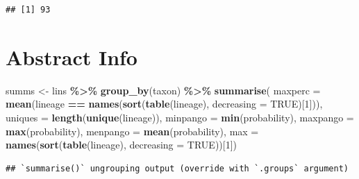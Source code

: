 \documentclass[
]{article}
\newenvironment{Shaded}{\begin{snugshade}}{\end{snugshade}}
\newcommand{\CommentTok}[1]{\textcolor[rgb]{0.56,0.35,0.01}{\textit{#1}}}
\newcommand{\DataTypeTok}[1]{\textcolor[rgb]{0.13,0.29,0.53}{#1}}
\newcommand{\DecValTok}[1]{\textcolor[rgb]{0.00,0.00,0.81}{#1}}
\newcommand{\KeywordTok}[1]{\textcolor[rgb]{0.13,0.29,0.53}{\textbf{#1}}}
\newcommand{\NormalTok}[1]{#1}
\newcommand{\OperatorTok}[1]{\textcolor[rgb]{0.81,0.36,0.00}{\textbf{#1}}}
\newcommand{\OtherTok}[1]{\textcolor[rgb]{0.56,0.35,0.01}{#1}}
\newcommand{\StringTok}[1]{\textcolor[rgb]{0.31,0.60,0.02}{#1}}
\begin{document}
\begin{Shaded}
\end{Shaded}

\begin{verbatim}
## [1] 93
\end{verbatim}

\hypertarget{abstract-info}{%
\section{Abstract Info}\label{abstract-info}}

\begin{Shaded}
\begin{Highlighting}[]
\NormalTok{summs \textless{}{-}}\StringTok{ }\NormalTok{lins }\OperatorTok{\%\textgreater{}\%}
\StringTok{    }\KeywordTok{group\_by}\NormalTok{(taxon) }\OperatorTok{\%\textgreater{}\%}
\StringTok{    }\KeywordTok{summarise}\NormalTok{(}
        \DataTypeTok{maxperc =} \KeywordTok{mean}\NormalTok{(lineage }\OperatorTok{==}\StringTok{ }\KeywordTok{names}\NormalTok{(}\KeywordTok{sort}\NormalTok{(}\KeywordTok{table}\NormalTok{(lineage),}
            \DataTypeTok{decreasing =} \OtherTok{TRUE}\NormalTok{)[}\DecValTok{1}\NormalTok{])),}
        \DataTypeTok{uniques =} \KeywordTok{length}\NormalTok{(}\KeywordTok{unique}\NormalTok{(lineage)),}
        \DataTypeTok{minpango =} \KeywordTok{min}\NormalTok{(probability),}
        \DataTypeTok{maxpango =} \KeywordTok{max}\NormalTok{(probability),}
        \DataTypeTok{menpango =} \KeywordTok{mean}\NormalTok{(probability),}
        \DataTypeTok{max =} \KeywordTok{names}\NormalTok{(}\KeywordTok{sort}\NormalTok{(}\KeywordTok{table}\NormalTok{(lineage), }\DataTypeTok{decreasing =} \OtherTok{TRUE}\NormalTok{))[}\DecValTok{1}\NormalTok{])}
\end{Highlighting}
\end{Shaded}

\begin{verbatim}
## `summarise()` ungrouping output (override with `.groups` argument)
\end{verbatim}
\end{document}

